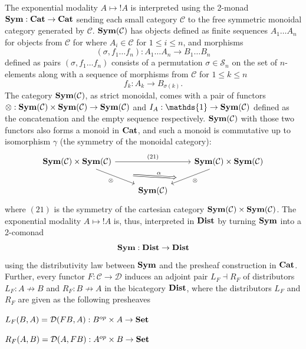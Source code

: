 \documentclass[8pt]{article}
\theoremstyle{definition}
\theoremstyle{definition}
\theoremstyle{definition}
\theoremstyle{definition}
\theoremstyle{definition}
\theoremstyle{definition}
\theoremstyle{definition}
\theoremstyle{definition}
\theoremstyle{definition}
\theoremstyle{definition}
\theoremstyle{definition}
\theoremstyle{definition}
\theoremstyle{definition}
\theoremstyle{definition}
\theoremstyle{question}
\DeclareMathOperator{\bang}{!}
\begin{document}
The exponential modality $A \mapsto \bang A$ is interpreted using the 2-monad ${\bf Sym} : {\bf Cat} \to {\bf Cat}$
sending each small category $\mathcal{C}$ to the free symmetric monoidal category generated by $\mathcal{C}$.
${\bf Sym}(\mathcal{C})$ has objects defined as finite sequences $A_1 \ldots A_n$ for objects from $\mathcal{C}$
for where $A_i \in \mathcal{C}$ for $1 \leq i \leq n$, and morphisms
\[
(\sigma, f_1 \dots f_n) : A_1 \ldots A_n \to B_1 \ldots B_n
\]
defined as pairs $(\sigma, f_1 \dots f_n)$ consists of a permutation $\sigma \in \mathcal{S}_n$ on the set
of $n$-elements along with a sequence of morphisms from $\mathcal{C}$ for $1 \leq k \leq n$
\[
f_k : A_k \to B_{\sigma(k)}.
\]
The category ${\bf Sym}(\mathcal{C})$, as strict monoidal, comes with a pair of functors 
$\otimes : {\bf Sym}(\mathcal{C}) \times {\bf Sym}(\mathcal{C}) \to {\bf Sym}(\mathcal{C})$ and $I_A : \mathds{1} \to {\bf Sym}(\mathcal{C})$
defined as the concatenation and the empty sequence respectively.
${\bf Sym}(\mathcal{C})$ with those two functors also forms a monoid in ${\bf Cat}$, and such a monoid
is commutative up to isomorphism $\gamma$ (the symmetry of the monoidal category):
\[
\begin{tikzcd}
  {\bf Sym}(\mathcal{C}) \times {\bf Sym}(\mathcal{C}) \ar[dr, "\otimes"', ""{name=otimes1}] \ar[rr, "(21)"] && {\bf Sym}(\mathcal{C}) \times {\bf Sym}(\mathcal{C}) \ar[dl, "\otimes", ""{name=otimes2}] \\
  & {\bf Sym}(\mathcal{C})
  \arrow[from=otimes1, to=otimes2, Rightarrow, "\alpha", shorten=6mm]
\end{tikzcd}
\]
where $(21)$ is the symmetry of the cartesian category ${\bf Sym}(\mathcal{C}) \times {\bf Sym}(\mathcal{C})$.
The exponential modality $A \mapsto \bang A$ is, thus, interpreted in ${\bf Dist}$ by turning ${\bf Sym}$ into a 2-comonad
\[
{\bf Sym} : {\bf Dist} \to {\bf Dist}
\]
using the distributivity law between ${\bf Sym}$ and the presheaf construction in ${\bf Cat}$. Further,
every functor $F : \mathcal{C} \to \mathcal{D}$ induces an adjoint pair $L_F \dashv R_F$ of distributors
$L_F : A \not\to B$ and $R_F : B \not\to A$ in the bicategory ${\bf Dist}$, where the distributors 
$L_F$ and $R_F$ are given as the following presheaves
\begin{center}
  $L_F(B, A) = \mathcal{D}(FB, A) : B^{op} \times A \to {\bf Set}$

  $R_F(A, B) = \mathcal{D}(A, FB) : A^{op} \times B \to {\bf Set}$
\end{center}
\end{document}
